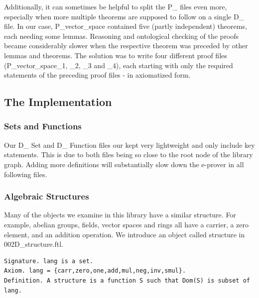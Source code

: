 \documentclass[11pt]{article}
\begin{document}
\begin{figure}[h]
\begin{center}
\end{center}
\end{figure}

Additionally, it can sometimes be helpful to split the P\_ files even more, especially when more multiple theorems are supposed to follow on a single D\_ file. In our case, P\_vector\_space contained five (partly independent) theorems, each needing some lemmas. Reasoning and ontological checking of the proofs became considerably slower when the respective theorem was preceded by other lemmas and theorems. The solution was to write four different proof files (P\_vector\_space\_1, \_2, \_3 and \_4), each starting with only the required statements of the preceding proof files - in axiomatized form.


\subsection{The Implementation}

\subsubsection{Sets and Functions}

Our D\_ Set and D\_ Function files our kept very lightweight and only include key statements. This is due to both files being so close to the root node of the library graph. Adding more definitions will substantially slow down the e-prover in all following files.

\subsubsection{Algebraic Structures} \label{algebraicStructures}
Many of the objects we examine in this library have a similar structure. For example, abelian groups, fields, vector spaces and rings all have a carrier, a zero element, and an addition operation. We introduce an object called structure in 002D\_structure.ftl.
\begin{lstlisting}
Signature. lang is a set.
Axiom. lang = {carr,zero,one,add,mul,neg,inv,smul}.
Definition. A structure is a function S such that Dom(S) is subset of lang.
\end{lstlisting}
\end{document}
